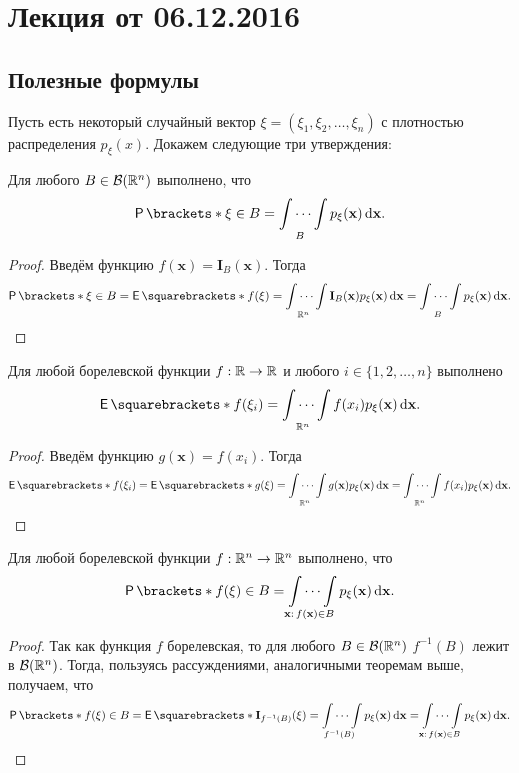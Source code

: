 \section{Лекция от 06.12.2016}

\subsection{Полезные формулы}
Пусть есть некоторый случайный вектор \(\xi = (\xi_1, \xi_2, \dots, \xi_n)\) с 
плотностью распределения \(p_{\xi}(x)\). Докажем следующие три утверждения:
\begin{theorem}
	Для любого \(B \in \mathcal{B}(\mathbb{R}^n)\) выполнено, что
	\[
		\Pr{\xi \in B} = \idotsint\limits_{B} p_{\xi}(\mathbf{x}) 
		\diff\mathbf{x}.
	\]
\end{theorem}
\begin{proof}
	Введём функцию \(f(\mathbf{x}) = \mathbf{I}_{B}(\mathbf{x})\). Тогда
	\[
		\Pr{\xi \in B} =\E{f(\xi)} = \idotsint\limits_{\R^n} 
		\mathbf{I}_{B}(\mathbf{x})p_{\xi}(\mathbf{x}) \diff\mathbf{x} = 
		\idotsint\limits_{B} p_{\xi}(\mathbf{x}) \diff\mathbf{x}.\qedhere
	\]
\end{proof}

\begin{theorem}
	Для любой борелевской функции \(f : \mathbb{R} \to \mathbb{R}\) и любого \(i \in \{1, 2, 
	\dots, n\}\) выполнено
	\[
		\E{f(\xi_i)} = \idotsint\limits_{\R^n} f(x_i)p_{\xi}(\mathbf{x}) 
		\diff\mathbf{x}.
	\]
\end{theorem}
\begin{proof}
	Введём функцию \(g(\mathbf{x}) = f(x_i)\). Тогда
	\[
		\E{f(\xi_i)} = \E{g(\xi)} = \idotsint\limits_{\R^n} 
		g(\mathbf{x})p_{\xi}(\mathbf{x}) \diff\mathbf{x} = 
		\idotsint\limits_{\R^n} f(x_i)p_{\xi}(\mathbf{x}) 
		\diff\mathbf{x}.\qedhere
	\]
\end{proof}
\begin{theorem}
	Для любой борелевской функции \(f : \mathbb{R}^n \to \mathbb{R}^n\) выполнено, что
	\[
	\Pr{f(\xi) \in B} = \idotsint\limits_{\mathbf{x}:\,f(\mathbf{x}) \in B} 
	p_{\xi}(\mathbf{x}) \diff\mathbf{x}.
	\]
\end{theorem}
\begin{proof}
	Так как функция \(f\) борелевская, то для любого \(B \in \mathcal{B}(\mathbb{R}^n)\) 
	\(f^{-1}(B)\) лежит в \(\mathcal{B}(\mathbb{R}^n)\). Тогда, пользуясь рассуждениями, 
	аналогичными теоремам выше, получаем, что
	\[
	\Pr{f(\xi) \in B} = \E{\mathbf{I}_{f^{-1}(B)}(\xi)} =  
	\idotsint\limits_{f^{-1}(B)} p_{\xi}(\mathbf{x}) \diff\mathbf{x} = 
	\idotsint\limits_{\mathbf{x}:\,f(\mathbf{x}) \in B} p_{\xi}(\mathbf{x}) 
	\diff\mathbf{x}.\qedhere
	\]
\end{proof}

